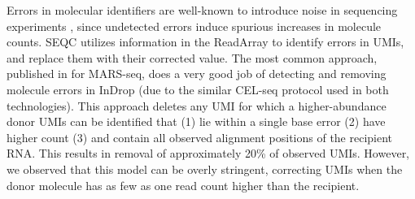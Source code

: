 Errors in molecular identifiers are well-known to introduce noise in sequencing experiments \citep{Jaitin2014}, since undetected errors induce spurious increases in molecule counts. 
SEQC utilizes information in the ReadArray to identify errors in UMIs, and replace them with their corrected value. 
The most common approach, published in \citep{Jaitin2014} for MARS-seq, does a very good job of detecting and removing molecule errors in InDrop (due to the similar CEL-seq protocol used in both technologies). 
This approach deletes any UMI for which a higher-abundance donor UMIs can be identified that (1) lie within a single base error (2) have higher count (3) and contain all observed alignment positions of the recipient RNA\@. 
This results in removal of approximately 20\% of observed UMIs. 
However, we observed that this model can be overly stringent, correcting UMIs when the donor molecule has as few as one read count higher than the recipient. %

